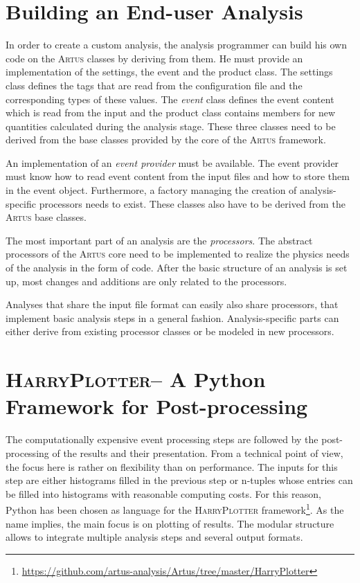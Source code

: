 \documentclass[3p]{elsarticle}
\newcommand{\software}[1]{\textsc{#1}\xspace}
\newcommand{\artus}{\software{Artus}}
\newcommand{\harryplotter}{\software{HarryPlotter}}
\begin{document}
\section{Building an End-user Analysis}
\label{section_artus_analysis}
In order to create a custom analysis, the analysis programmer can build his own code on the \artus classes by deriving from them.
He must provide an implementation of the settings, the event and the product class.
The settings class defines the tags that are read from the configuration file and the corresponding types of these values.
The \emph{event} class defines the event content which is read from the input and the product class contains members for new quantities calculated during the analysis stage.
These three classes need to be derived from the base classes provided by the core of the \artus framework.

An implementation of an \emph{event provider} must be available.
The event provider must know how to read event content from the input files and how to store them in the event object.
Furthermore, a factory managing the creation of analysis-specific processors needs to exist.
These classes also have to be derived from the \artus base classes.

The most important part of an analysis are the \emph{processors}.
The abstract processors of the \artus core need to be implemented to realize the physics needs of the analysis in the form of code.
After the basic structure of an analysis is set up, most changes and additions are only related to the processors.

Analyses that share the input file format can easily also share processors, that implement basic analysis steps in a general fashion.
Analysis-specific parts can either derive from existing processor classes or be modeled in new processors.


\section{\harryplotter -- A Python Framework for Post-processing}
\label{section_artus_harryplotter}

The computationally expensive event processing steps are followed by the post-processing of the results and their presentation.
From a technical point of view, the focus here is rather on flexibility than on performance.
The inputs for this step are either histograms filled in the previous step or n-tuples whose entries can be filled into histograms with reasonable computing costs.
For this reason, Python has been chosen as language for the \harryplotter framework\footnote{\url{https://github.com/artus-analysis/Artus/tree/master/HarryPlotter}}.
As the name implies, the main focus is on plotting of results.
The modular structure allows to integrate multiple analysis steps and several output formats.
\end{document}
